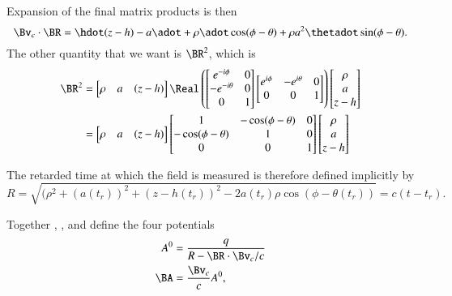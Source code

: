 {Expansion of the final matrix products is then
%
\begin{equation}\label{eqn:relativisticElectrodynamicsExamReflection:880}
\Bv_c \cdot \BR = \hdot (z - h) -a \adot + \rho \adot \cos(\phi- \theta) + \rho a^2 \thetadot \sin(\phi - \theta).
\end{equation}
The other quantity that we want is \(\BR^2\), which is
\begin{equation}\label{eqn:relativisticElectrodynamicsExamReflection:1270}
\begin{aligned}
\BR^2 &=
\begin{bmatrix}
\rho &
a &
(z - h)
\end{bmatrix}
\Real \left(
\begin{bmatrix}
e^{-i\phi}  & 0 \\
-e^{-i\theta}  & 0 \\
0 & 1
\end{bmatrix}
\begin{bmatrix}
e^{i\phi} & -e^{i\theta} & 0 \\
0 & 0 & 1
\end{bmatrix}
\right)
\begin{bmatrix}
\rho \\
a \\
z - h
\end{bmatrix} \\
&=
\begin{bmatrix}
\rho &
a &
(z - h)
\end{bmatrix}
\begin{bmatrix}
1 & -\cos(\phi-\theta) & 0 \\
-\cos(\phi-\theta) & 1 & 0 \\
0 & 0 & 1
\end{bmatrix}
\begin{bmatrix}
\rho \\
a \\
z - h
\end{bmatrix} \\
\end{aligned}
\end{equation}

The retarded time at which the field is measured is therefore defined implicitly by
%
\begin{equation}\label{eqn:relativisticElectrodynamicsExamReflection:900}
R = \sqrt{(\rho^2 + (a(t_r))^2 + (z-h(t_r))^2 - 2 a(t_r) \rho \cos(\phi - \theta(t_r))} = c( t - t_r).
\end{equation}

Together , , and  define the four potentials
%
\begin{equation}\label{eqn:relativisticElectrodynamicsExamReflection:910}
\begin{aligned}
A^0 &= \frac{q}{R - \BR \cdot \Bv_c/c} \\
\BA &= \frac{\Bv_c}{c} A^0,
\end{aligned}
\end{equation}

}
